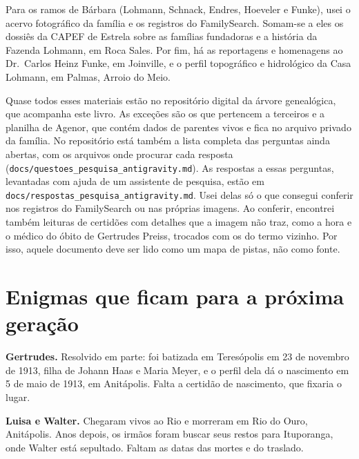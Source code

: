\documentclass[
  brazilian,
  11pt,
  openany]{book}
\begin{document}
Para os ramos de Bárbara (Lohmann, Schnack, Endres, Hoeveler e Funke),
usei o acervo fotográfico da família e os registros do FamilySearch.
Somam-se a eles os dossiês da CAPEF de Estrela sobre as famílias
fundadoras e a história da Fazenda Lohmann, em Roca Sales. Por fim, há
as reportagens e homenagens ao Dr.~Carlos Heinz Funke, em Joinville, e o
perfil topográfico e hidrológico da Casa Lohmann, em Palmas, Arroio do
Meio.

Quase todos esses materiais estão no repositório digital da árvore
genealógica, que acompanha este livro. As exceções são os que pertencem
a terceiros e a planilha de Agenor, que contém dados de parentes vivos e
fica no arquivo privado da família. No repositório está também a lista
completa das perguntas ainda abertas, com os arquivos onde procurar cada
resposta (\texttt{docs/questoes\_pesquisa\_antigravity.md}). As
respostas a essas perguntas, levantadas com ajuda de um assistente de
pesquisa, estão em \texttt{docs/respostas\_pesquisa\_antigravity.md}.
Usei delas só o que consegui conferir nos registros do FamilySearch ou
nas próprias imagens. Ao conferir, encontrei também leituras de
certidões com detalhes que a imagem não traz, como a hora e o médico do
óbito de Gertrudes Preiss, trocados com os do termo vizinho. Por isso,
aquele documento deve ser lido como um mapa de pistas, não como fonte.

\section{Enigmas que ficam para a próxima
geração}\label{enigmas-que-ficam-para-a-pruxf3xima-gerauxe7uxe3o}

\textbf{Gertrudes.} Resolvido em parte: foi batizada em Teresópolis em
23 de novembro de 1913, filha de Johann Haas e Maria Meyer, e o perfil
dela dá o nascimento em 5 de maio de 1913, em Anitápolis. Falta a
certidão de nascimento, que fixaria o lugar.

\textbf{Luisa e Walter.} Chegaram vivos ao Rio e morreram em Rio do
Ouro, Anitápolis. Anos depois, os irmãos foram buscar seus restos para
Ituporanga, onde Walter está sepultado. Faltam as datas das mortes e do
traslado.
\end{document}

